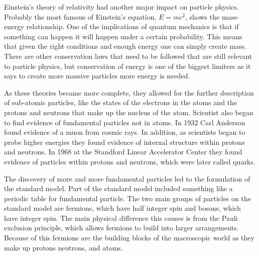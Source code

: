 Einstein's theory of relativity had another major impact on particle physics. Probably the most famous of Einstein's equation, $E = mc^2$, shows the mass-energy relationship. One of the implications of quantum mechanics is that if something can happen it will happen under a certain probability. This means that given the right conditions and enough energy one can simply create mass. There are other conservation laws that need to be followed that are still relevant to particle physics, but conservation of energy is one of the biggest limiters as it says to create more massive particles more energy is needed. 

As these theories became more complete, they allowed for the further description of sub-atomic particles, like the states of the electrons in the atoms and the protons and neutrons that make up the nucleus of the atom. Scientist also began to find evidence of fundamental particles not in atoms. In 1932 Carl Anderson found evidence of a muon from cosmic rays. In addition, as scientists began to probe higher energies they found evidence of internal structure within protons and neutrons. In 1968 at the Standford Linear Accelerator Center they found evidence of particles within protons and neutrons, which were later called quarks.

The discovery of more and more fundamental particles led to the formulation of the standard model. Part of the standard model included something like a periodic table for fundamental particle. The two main groups of particles on the standard model are fermions, which have half integer spin and bosons, which have integer spin. The main physical difference this causes is from the Pauli exclusion principle, which allows fermions to build into larger arrangements. Because of this fermions are the building blocks of the macroscopic world as they make up protons neutrons, and atoms.   

